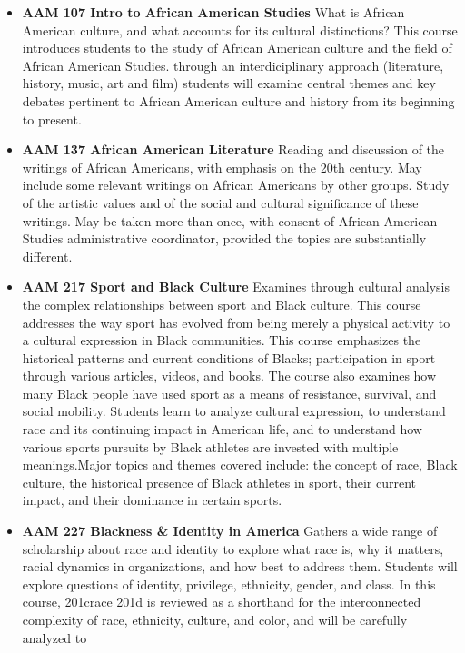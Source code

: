 \documentclass[
  letterpaper,
]{scrbook}
\providecommand{\tightlist}{%
  \setlength{\itemsep}{0pt}\setlength{\parskip}{0pt}}
\begin{document}
\begin{itemize}
\tightlist
\item
  \textbf{AAM 107 Intro to African American Studies} What is African
  American culture, and what accounts for its cultural distinctions?
  This course introduces students to the study of African American
  culture and the field of African American Studies. through an
  interdiciplinary approach (literature, history, music, art and film)
  students will examine central themes and key debates pertinent to
  African American culture and history from its beginning to present.
\item
  \textbf{AAM 137 African American Literature} Reading and discussion of
  the writings of African Americans, with emphasis on the 20th century.
  May include some relevant writings on African Americans by other
  groups. Study of the artistic values and of the social and cultural
  significance of these writings. May be taken more than once, with
  consent of African American Studies administrative coordinator,
  provided the topics are substantially different.
\item
  \textbf{AAM 217 Sport and Black Culture} Examines through cultural
  analysis the complex relationships between sport and Black culture.
  This course addresses the way sport has evolved from being merely a
  physical activity to a cultural expression in Black communities. This
  course emphasizes the historical patterns and current conditions of
  Blacks; participation in sport through various articles, videos, and
  books. The course also examines how many Black people have used sport
  as a means of resistance, survival, and social mobility. Students
  learn to analyze cultural expression, to understand race and its
  continuing impact in American life, and to understand how various
  sports pursuits by Black athletes are invested with multiple
  meanings.Major topics and themes covered include: the concept of race,
  Black culture, the historical presence of Black athletes in sport,
  their current impact, and their dominance in certain sports.
\item
  \textbf{AAM 227 Blackness \& Identity in America} Gathers a wide range
  of scholarship about race and identity to explore what race is, why it
  matters, racial dynamics in organizations, and how best to address
  them. Students will explore questions of identity, privilege,
  ethnicity, gender, and class. In this course, 201crace 201d is
  reviewed as a shorthand for the interconnected complexity of race,
  ethnicity, culture, and color, and will be carefully analyzed to

\end{itemize}
\end{document}
